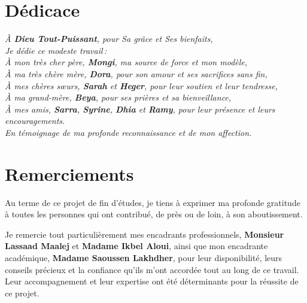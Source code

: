 \documentclass[a4paper,12pt,oneside]{report}
\begin{document}
\setcounter{page}{1}

\chapter*{Dédicace}
\thispagestyle{plain}

\vspace*{\fill}
\begin{center}
\itshape
À \textbf{Dieu Tout-Puissant}, pour Sa grâce et Ses bienfaits,\\[1.2em]

Je dédie ce modeste travail\,:\\[1.2em]

À mon très cher père, \textbf{Mongi}, ma source de force et mon modèle,\\[0.6em]
À ma très chère mère, \textbf{Dora}, pour son amour et ses sacrifices sans fin,\\[0.6em]
À mes chères sœurs, \textbf{Sarah} et \textbf{Heger}, pour leur soutien et leur tendresse,\\[0.6em]
À ma grand-mère, \textbf{Beya}, pour ses prières et sa bienveillance,\\[0.6em]
À mes amis, \textbf{Sarra}, \textbf{Syrine}, \textbf{Dhia} et \textbf{Ramy}, pour leur présence et leurs encouragements.\\[1.6em]

En témoignage de ma profonde reconnaissance et de mon affection.
\end{center}
\vspace*{\fill}

\chapter*{Remerciements}
\thispagestyle{plain}

Au terme de ce projet de fin d'études, je tiens à exprimer ma profonde gratitude à toutes
les personnes qui ont contribué, de près ou de loin, à son aboutissement.

Je remercie tout particulièrement mes encadrants professionnels, \textbf{Monsieur Lassaad Maalej}
et \textbf{Madame Ikbel Aloui}, ainsi que mon encadrante académique, \textbf{Madame Saoussen
Lakhdher}, pour leur disponibilité, leurs conseils précieux et la confiance qu'ils m'ont accordée
tout au long de ce travail. Leur accompagnement et leur expertise ont été déterminants pour la
réussite de ce projet.
\end{document}

